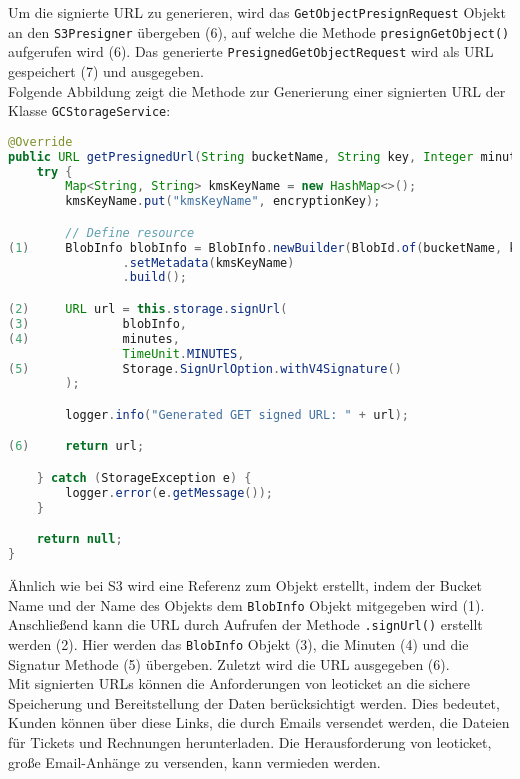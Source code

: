 Um die signierte URL zu generieren, wird das \verb|GetObjectPresignRequest| Objekt an den \verb|S3Presigner| übergeben (6), auf welche die Methode \verb|presignGetObject()| aufgerufen wird (6). Das generierte \verb|PresignedGetObjectRequest| wird als URL gespeichert (7) und ausgegeben.\\

Folgende Abbildung zeigt die Methode zur Generierung einer signierten URL der \\Klasse \verb|GCStorageService|:

\begin{lstlisting}[language=Java, caption=Prototyp Code Snippet - Generierung einer signierten URL durch GC]
@Override
public URL getPresignedUrl(String bucketName, String key, Integer minutes, String encryptionKey) {
    try {
        Map<String, String> kmsKeyName = new HashMap<>();
        kmsKeyName.put("kmsKeyName", encryptionKey);

        // Define resource
(1)     BlobInfo blobInfo = BlobInfo.newBuilder(BlobId.of(bucketName, key))
                .setMetadata(kmsKeyName)
                .build();

(2)     URL url = this.storage.signUrl(
(3)             blobInfo,
(4)             minutes,
                TimeUnit.MINUTES,
(5)             Storage.SignUrlOption.withV4Signature()
        );

        logger.info("Generated GET signed URL: " + url);

(6)     return url;

    } catch (StorageException e) {
        logger.error(e.getMessage());
    }

    return null;
}
\end{lstlisting}

Ähnlich wie bei S3 wird eine Referenz zum Objekt erstellt, indem der Bucket Name und der Name des Objekts dem \verb|BlobInfo| Objekt mitgegeben wird (1). Anschließend kann die URL durch Aufrufen der Methode \verb|.signUrl()| erstellt werden (2). Hier werden das \verb|BlobInfo| Objekt (3), die Minuten (4) und die Signatur Methode (5) übergeben. Zuletzt wird die URL ausgegeben (6).\\

Mit signierten URLs können die Anforderungen von leoticket an die sichere Speicherung und Bereitstellung der Daten berücksichtigt werden. Dies bedeutet, Kunden können über diese Links, die durch Emails versendet werden, die Dateien für Tickets und Rechnungen herunterladen. Die Herausforderung von leoticket, große Email-Anhänge zu versenden, kann vermieden werden.\\


